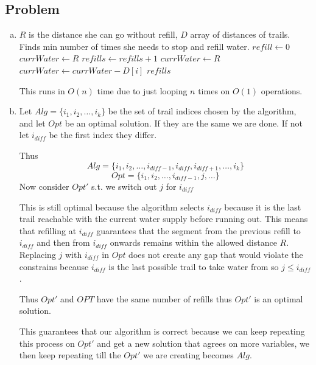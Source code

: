 \documentclass[12pt, letterpaper]{article}
\theoremstyle{definition}
\newcounter{problem}
\newcommand{\q}{
    \newpage %
    \stepcounter{problem} %
    \subsection*{Problem \arabic{problem}} %
}
\begin{document}
\q
\begin{enumerate}[(a)]
    \item \begin{algorithm}[H]
        \caption{Min Refills}
        \begin{algorithmic}[1]
        \Require $R$ is the distance she can go without refill, $D$ array of distances of trails.
        \Ensure Finds min number of times she needs to stop and refill water.
            \State $refill \gets 0$
            \State $currWater \gets R$
                    \State $refills \gets refills + 1$
                    \State $currWater \gets R$
                \EndIf
                \State $currWater \gets currWater - D[i]$
            \EndFor
            \State \Return $refills$
        \EndFunction
        \end{algorithmic}
        \end{algorithm}

        This runs in $O(n)$ time due to just looping $n$ times on $O(1)$ operations.

    \item Let $Alg=\{i_1,i_2,\dots,i_k\}$ be the set of trail indices chosen by the algorithm, and let $Opt$ be an optimal solution. If they are the same we are done. If not let $i_{diff}$ be the first index they differ.
    
    Thus
    \[Alg=\{i_1,i_2,\dots,i_{diff-1},i_{diff},i_{diff+1},\dots,i_k\}\]
    \[Opt=\{i_1,i_2,\dots,i_{diff-1},j,\dots\}\]
    Now consider $Opt'$ s.t. we switch out $j$ for $i_{diff}$

    This is still optimal because the algorithm selects $i_{diff}$ because it is the last trail reachable with the current water supply before running out. This means that refilling at $i_{diff}$ guarantees that the segment from the previous refill to $i_{diff}$ and then from $i_{diff}$ onwards remains within the allowed distance $R$. Replacing $j$ with $i_{diff}$ in $Opt$ does not create any gap that would violate the constrains because $i_{diff}$ is the last possible trail to take water from so $j \leq i_{diff}$.

    Thus $Opt'$ and $OPT$ have the same number of refills thus $Opt'$ is an optimal solution.

    This guarantees that our algorithm is correct because we can keep repeating this process on $Opt'$ and get a new solution that agrees on more variables, we then keep repeating till the $Opt'$ we are creating becomes $Alg$.


\end{enumerate}
\end{document}
